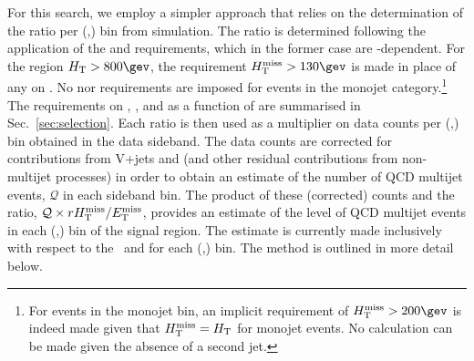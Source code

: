For this search, we employ a simpler approach that relies on the
determination of the ratio \rmhtmet per (\njet,\scalht) bin from
simulation. The ratio is determined following the application of the
\alphat and \bdphi requirements, which in the former case are
\scalht-dependent. For the region $\scalht > 800\gev$, the requirement
$\mht > 130\gev$ is made in place of any on \alphat. No \alphat nor
\mht requirements are imposed for events in the monojet
category.\footnote{For events in the monojet bin, an implicit
  requirement of $\mht > 200\gev$ is indeed made given that $\mbox{$H_{\rm T}^{\rm miss}$} =
  \mbox{$H_\text{T}$}$ for monojet events. No \alphat calculation can be made
  given the absence of a second jet.} The requirements on \alphat,
\mht, and \bdphi as a function of \scalht are summarised in
Sec.~\ref{sec:selection}. Each ratio \rmhtmet is then used as a
multiplier on data counts per (\njet,\scalht) bin obtained in the
\mhtmet data sideband. The data counts are corrected for contributions
from V+jets and \ttbar (and other residual contributions from
non-multijet processes) in order to obtain an estimate of the number
of QCD multijet events, $\mathcal{Q}$ in each sideband bin. The
product of these (corrected) counts and the ratio, $\mathcal{Q} \times
r\mbox{$\mbox{$H_{\rm T}^{\rm miss}$} / \mbox{$E_\text{T}^{\rm miss}$}$}$, provides an estimate of the level of QCD multijet events in
each (\njet,\scalht) bin of the signal region. The estimate is
currently made inclusively with respect to the \nb\ and \mht for each
(\njet,\scalht) bin. The method is outlined in more detail below.

